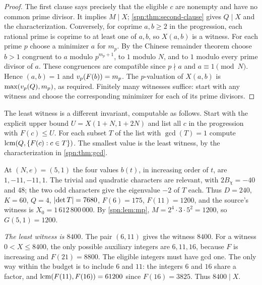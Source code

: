 \begin{proof}
The first clause says precisely that the eligible $c$ are nonempty and have
no common prime divisor. It implies $M\mid X$; \cref{spn:thm:second-clause}
gives $Q\mid X$ and the characterization. Conversely, for coprime $a,b\ge2$
in the progression, each rational prime is coprime to at least one of $a,b$,
so $X(a,b)$ is a witness. For each prime $p$ choose a minimizer $a$ for
$m_p$. By the Chinese remainder theorem choose $b>1$ congruent to $a$ modulo
$p^{m_p+1}$, to $1$ modulo $N$, and to $1$ modulo every prime divisor of
$a$. These congruences are compatible since $p\nmid a$ and
$a\equiv1\pmod N$. Hence $(a,b)=1$ and $v_p(F(b))=m_p$. The $p$-valuation of
$X(a,b)$ is $\max(v_p(Q),m_p)$, as required. Finitely many witnesses
suffice: start with any witness and choose the corresponding minimizer for
each of its prime divisors.
\end{proof}

The least witness is a different invariant, computable as follows. Start with
the explicit upper bound $U=X(1+N,1+2N)$ and list all $c$ in the progression
with $F(c)\le U$. For each subset $T$ of the list with $\gcd(T)=1$ compute
$\operatorname{lcm}(Q,\{F(c):c\in T\})$. The smallest value is the least witness, by the
characterization in \cref{spn:thm:gcd}.

\begin{example}\label{spn:ex:five}
At $(N,e)=(5,1)$ the four values $b(t)$, in increasing order of $t$, are
$1,-11,-11,1$. The trivial and quadratic characters are relevant, with
$2B_\chi=-40$ and $48$; the two odd characters give the eigenvalue $-2$ of
$T$ each. Thus $D=240$, $K=60$, $Q=4$, $\lvert\det T\rvert=7680$, $F(6)=175$,
$F(11)=1200$, and the source's witness is $X_0=1\,612\,800\,000$. By
\cref{spn:lem:mp}, $M=2^4\cdot3\cdot5^2=1200$, so $G(5,1)=1200$.

\emph{The least witness is $8400$.} The pair $(6,11)$ gives the witness
$8400$. For a witness $0<X\le8400$, the only possible auxiliary integers are
$6,11,16$, because $F$ is increasing and $F(21)=8800$. The eligible integers
must have gcd one. The only way within the budget is to include $6$ and
$11$: the integers $6$ and $16$ share a factor, and
$\operatorname{lcm}(F(11),F(16))=61200$ since $F(16)=3825$. Thus $8400\mid X$.
\end{example}

